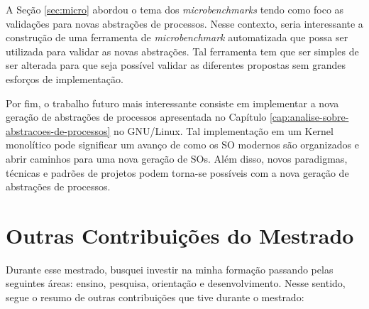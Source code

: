 A Seção \ref{sec:micro} abordou o tema dos \textit{microbenchmarks} tendo como
foco as validações para novas abstrações de processos. Nesse contexto, seria
interessante a construção de uma ferramenta de \textit{microbenchmark}
automatizada que possa ser utilizada para validar as novas abstrações. Tal
ferramenta tem que ser simples de ser alterada para que seja possível validar
as diferentes propostas sem grandes esforços de implementação.

Por fim, o trabalho futuro mais interessante consiste em implementar a nova
geração de abstrações de processos apresentada no Capítulo
\ref{cap:analise-sobre-abstracoes-de-processos} no GNU/Linux. Tal implementação
em um Kernel monolítico pode significar um avanço de como os SO modernos são
organizados e abrir caminhos para uma nova geração de SOs. Além disso, novos
paradigmas, técnicas e padrões de projetos podem torna-se possíveis com a nova
geração de abstrações de processos.

\section{Outras Contribuições do Mestrado}

Durante esse mestrado, busquei investir na minha formação passando pelas
seguintes áreas: ensino, pesquisa, orientação e desenvolvimento. Nesse sentido,
segue o resumo de outras contribuições que tive durante o mestrado:

